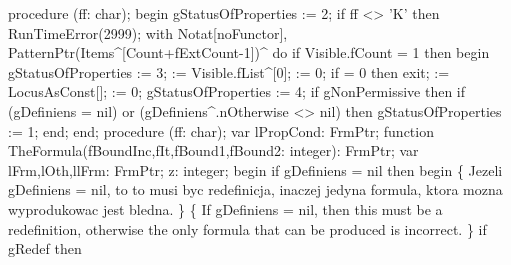 procedure (ff: char);
begin
   gStatusOfProperties := 2;
   if ff <> 'K' then RunTimeError(2999);
   with Notat[noFunctor], PatternPtr(Items^[Count+fExtCount-1])^ do
   if Visible.fCount = 1 then
   begin
      gStatusOfProperties := 3;
       := Visible.fList^[0];  := 0;
      if  = 0 then exit;
       := LocusAsConst[];
       := 0;
      gStatusOfProperties := 4;
      if gNonPermissive then
         if (gDefiniens = nil) or (gDefiniens^.nOtherwise <> nil) then
            gStatusOfProperties := 1;
   end;
end;
\eatline
{}\nwendcode{}\nwdocspar
\nwenddocs{}\endmoddef\nwstartdeflinemarkup{}\nwenddeflinemarkup
procedure (ff: char);
var
   lPropCond: FrmPtr;
   function TheFormula(fBoundInc,fIt,fBound1,fBound2: integer): FrmPtr;
   var
      lFrm,lOth,llFrm: FrmPtr;
      z: integer;
   begin
      if gDefiniens = nil then
      begin
         \{ Jezeli gDefiniens = nil, to to musi byc redefinicja, inaczej
           jedyna formula, ktora mozna wyprodukowac jest bledna.
         \}
         \{ If gDefiniens = nil, then this must be a redefinition, otherwise
           the only formula that can be produced is incorrect. \}
         if gRedef then
